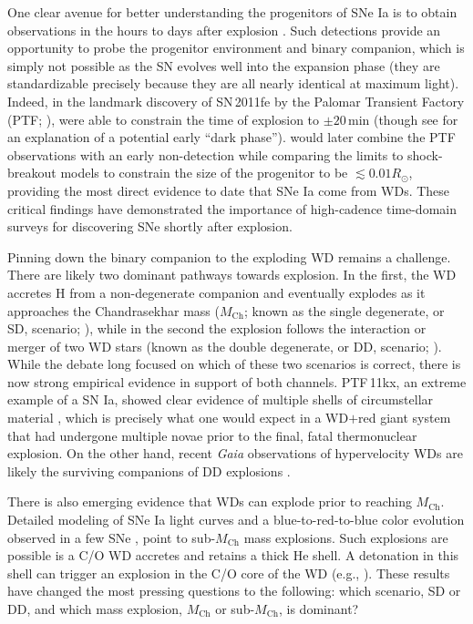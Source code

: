 \documentclass[twocolumn]{./aastex63}
\begin{document}
One clear avenue for better understanding the progenitors of SNe Ia is to obtain
observations in the hours to days after explosion \citep{Maoz14}. Such
detections provide an opportunity to probe the progenitor environment and binary
companion, which is simply not possible as the SN evolves well into the
expansion phase (they are standardizable precisely because they are all nearly
identical at maximum light). Indeed, in the landmark discovery of SN\,2011fe by
the Palomar Transient Factory (PTF; \citealt{law09,rau09}), \citet{Nugent11}
were able to constrain the time of explosion to $\pm 20$\,min (though see
\citealt{Piro13} for an explanation of a potential early ``dark phase'').
\citet{Bloom12a} would later combine the PTF observations with an early
non-detection while comparing the limits to shock-breakout models to constrain
the size of the progenitor to be $\lesssim 0.01 R_\odot$, providing the most
direct evidence to date that SNe Ia come from WDs. These critical findings have
demonstrated the importance of high-cadence time-domain surveys for discovering
SNe shortly after explosion.

Pinning down the binary companion to the exploding WD remains a challenge. There
are likely two dominant pathways towards explosion. In the first, the WD
accretes H from a non-degenerate companion and eventually explodes as it
approaches the Chandrasekhar mass ($M_\mathrm{Ch}$; known as the single
degenerate, or SD, scenario; \citealt{Whelan73}), while in the second the
explosion follows the interaction or merger of two WD stars (known as the double
degenerate, or DD, scenario; \citealt{Webbink84}). While the debate long focused
on which of these two scenarios is correct, there is now strong empirical
evidence in support of both channels. PTF\,11kx, an extreme example of a SN Ia,
showed clear evidence of multiple shells of circumstellar material
\citep{Dilday12}, which is precisely what one would expect in a WD$+$red giant
system that had undergone multiple novae prior to the final, fatal thermonuclear
explosion. On the other hand, recent \textit{Gaia} observations of hypervelocity
WDs are likely the surviving companions of DD explosions \citep{Shen18}.

There is also emerging evidence that WDs can explode prior to reaching
$M_\mathrm{Ch}$. Detailed modeling of SNe Ia light curves \citep{Scalzo14a} and
a blue-to-red-to-blue color evolution observed in a few SNe
\citep{Jiang17,Polin19,De19}, point to sub-$M_\mathrm{Ch}$ mass explosions. Such
explosions are possible is a C/O WD accretes and retains a thick He shell. A
detonation in this shell can trigger an explosion in the C/O core of the WD
(e.g., \citealt{Nomoto82,Nomoto82a}). These results have changed the most
pressing questions to the following: which scenario, SD or DD, and which mass
explosion, $M_\mathrm{Ch}$ or sub-$M_\mathrm{Ch}$, is dominant?
\end{document}

